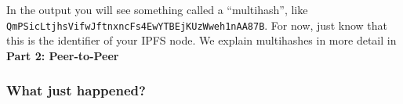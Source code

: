\begin{Shaded}
\begin{Highlighting}[]
 \NormalTok{() }\OperatorTok{\{}
  \OperatorTok{,}\OperatorTok{\{}
    \OperatorTok{=}  \NormalTok{(}\OperatorTok{\{}
      \OperatorTok{:} \OperatorTok{\{} \OperatorTok{:}  \OperatorTok{\},}
      \OperatorTok{:} \OperatorTok{,}
      \OperatorTok{:} \OperatorTok{\{} \OperatorTok{:}  \OperatorTok{\},}
      \OperatorTok{:} \OperatorTok{\{}
        \OperatorTok{:}\NormalTok{ []}\OperatorTok{,}
        \OperatorTok{:} \OperatorTok{\{} \OperatorTok{:}\NormalTok{ [] }\OperatorTok{\}}
      \OperatorTok{\}}
    \OperatorTok{\}}\NormalTok{)}\OperatorTok{;}

    \NormalTok{(}\OperatorTok{,}\OperatorTok{=>} \OperatorTok{\{}   \OperatorTok{\}}\NormalTok{)}
    \NormalTok{(}\OperatorTok{,} \NormalTok{ () }\OperatorTok{=>} \OperatorTok{\{}
\OperatorTok{=}
      \NormalTok{(}\NormalTok{)}
    \OperatorTok{\}}\NormalTok{)}
  \OperatorTok{\}}
\OperatorTok{\}}
\end{Highlighting}
\end{Shaded}

In the output you will see something called a ``multihash'', like
\texttt{QmPSicLtjhsVifwJftnxncFs4EwYTBEjKUzWweh1nAA87B}. For now, just
know that this is the identifier of your IPFS node. We explain
multihashes in more detail in \textbf{Part 2: Peer-to-Peer}

\subsubsection{What just happened?}\label{what-just-happened-3}

